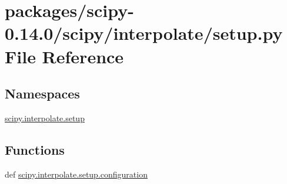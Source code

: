 \hypertarget{packages_2scipy-0_814_80_2scipy_2interpolate_2setup_8py}{}\section{packages/scipy-\/0.14.0/scipy/interpolate/setup.py File Reference}
\label{packages_2scipy-0_814_80_2scipy_2interpolate_2setup_8py}
\subsection*{Namespaces}
\begin{DoxyCompactItemize}
\item 
 \hyperlink{namespacescipy_1_1interpolate_1_1setup}{scipy.\+interpolate.\+setup}
\end{DoxyCompactItemize}
\subsection*{Functions}
\begin{DoxyCompactItemize}
\item 
def \hyperlink{namespacescipy_1_1interpolate_1_1setup_a90f1ab9d64eba4c1ce815393fcc1385c}{scipy.\+interpolate.\+setup.\+configuration}
\end{DoxyCompactItemize}
